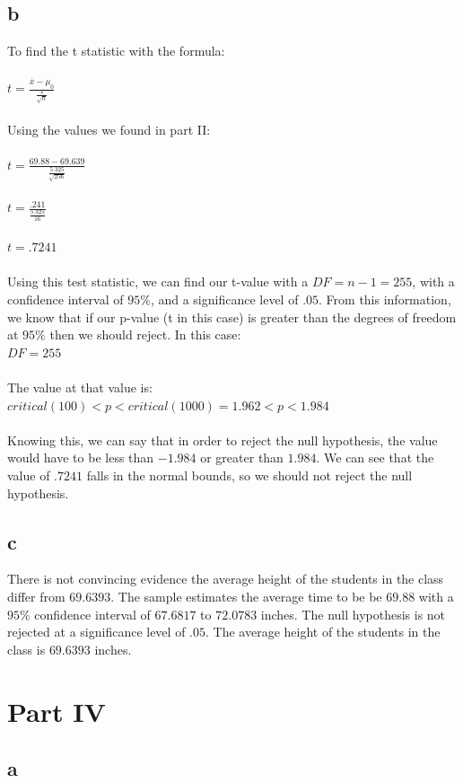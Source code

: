\documentclass[10pt,letterpaper]{article}
\begin{document}
\subsection*{b}
To find the t statistic with the formula:\\\\
$t=\frac{\bar{x}-\mu_0}{\frac{s}{\sqrt{n}}}$\\\\
Using the values we found in part II:\\\\
$t=\frac{69.88-69.639}{\frac{5.325}{\sqrt{256}}}$\\\\
$t=\frac{.241}{\frac{5.325}{16}}$\\\\
$t=.7241$\\\\
Using this test statistic, we can find our t-value with a $DF=n-1=255$, with a
confidence interval of $95\%$, and a significance level of $.05$. From this 
information, we know that if our p-value (t in this case) is greater than the
degrees of freedom at $95\%$ then we should reject. In this case:\\
$DF=255$\\\\
The value at that value is: $critical(100) < p < critical(1000) = 1.962 < p < 
1.984$\\\\
Knowing this, we can say that in order to reject the null hypothesis, the value
would have to be less than $-1.984$ or greater than $1.984$. We can see that
the value of $.7241$ falls in the normal bounds, so we should not reject the
null hypothesis.

\subsection*{c}
There is not convincing evidence the average height of the students in the
class differ from $69.6393$. The sample estimates the average time to be be 
$69.88$ with a $95\%$ confidence interval of $67.6817$ to $72.0783$ inches. The
null hypothesis is not rejected at a significance level of $.05$. The average
height of the students in the class is $69.6393$ inches.


\section*{Part IV}
\subsection*{a}
\end{document}
